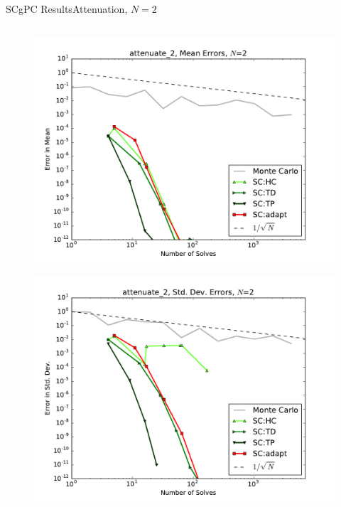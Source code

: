 \documentclass{beamer}
\begin{document}
\begin{frame}{SCgPC Results}{Attenuation, $N=2$}
\begin{columns}
\begin{column}{0.5\textwidth}
\begin{figure}[h!]
          \includegraphics[width=0.8\linewidth]{anlmodels/attenuate_2_mean_errs_nohdmr}
        \end{figure}
        \vspace{-20pt}
        \begin{figure}[h!]
          \centering
          \includegraphics[width=0.8\linewidth]{anlmodels/attenuate_2_variance_errs_nohdmr}
        \end{figure}
   \end{column}
 \end{columns}
\end{frame}
\end{document}
